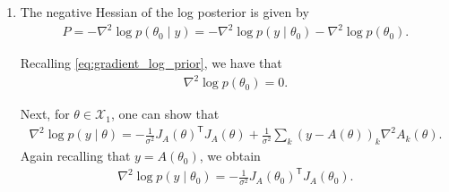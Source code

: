 \documentclass{homework}
\newcommand*{\e}{\mathrm{e}}
\begin{document}
\begin{enumerate}
    For $\theta \in \mathcal{X}_1$, we have that
    \begin{align*}
    \nabla\log p(y\mid\theta)
    = \nabla\left(-\frac{1}{2\sigma^2}\lVert y-A(\theta)\rVert_2^2 \right)
    = \frac{1}{\sigma^2}J_A(\theta)^{\mathsf T}\left(y-A(\theta) \right),
    \end{align*}
    where $J_A(\theta)$ 
    is the Jacobian of the forward map $A$ (restricted to the domain $\mathcal{X}_1$).
    Recalling that $y=A(\theta_0)$,
    \begin{align}
    \nabla\log p(y\mid\theta_0) = \frac{1}{\sigma^2}J_A(\theta_0)^{\mathsf T}\left(y-A(\theta_0) \right) = 0. \label{eq:gradient_log_likelihood_0}
    \end{align}

    Finally, for $\theta \in \mathcal{X}_1$, we have that
    \begin{align}
    \nabla \log p(\theta) 
    = \nabla \log \left(\lambda_R \e^{-\lambda_r R} \right)
    = \nabla \left(-\lambda_R R \right)
    = \left(0, 0, -\lambda_R, 0 \right)^{\mathsf T}. \label{eq:gradient_log_prior}
    \end{align}
    
    Combining \eqref{eq:gradient_log_posterior}, \eqref{eq:gradient_log_likelihood_0}, and \eqref{eq:gradient_log_prior}, we have that
    \[
    g
    =
    \left(0, 0, -\lambda_R, 0 \right)^{\mathsf T}.
    \]

    \item The negative Hessian of the log posterior is given by
    \begin{align}
    P = -\nabla^2\log p(\theta_0\mid y)
    =
    -\nabla^2\log p(y\mid\theta_0)
    -\nabla^2\log p(\theta_0). \label{eq:hessian_log_posterior}
    \end{align}

    Recalling \eqref{eq:gradient_log_prior}, we have that
    \begin{align}
    \nabla^2\log p(\theta_0)=0. \label{eq:hessian_log_prior_0}
    \end{align}

    Next, for $\theta \in \mathcal{X}_1$, one can show that
    \begin{align*}
    \nabla^2\log p(y\mid\theta)
    =
    -\frac{1}{\sigma^2}J_A(\theta)^{\mathsf T}J_A(\theta)
    +
    \frac{1}{\sigma^2}
    \sum_k (y - A(\theta))_k \nabla^2A_k(\theta).
    \end{align*}
    Again recalling that $y = A(\theta_0)$, we obtain
    \begin{align}
    \nabla^2\log p(y\mid\theta_0)
    = -\frac{1}{\sigma^2}J_A(\theta_0)^{\mathsf T}J_A(\theta_0). \label{eq:hessian_log_likelihood_0}
    \end{align}


\end{enumerate}
\end{document}
